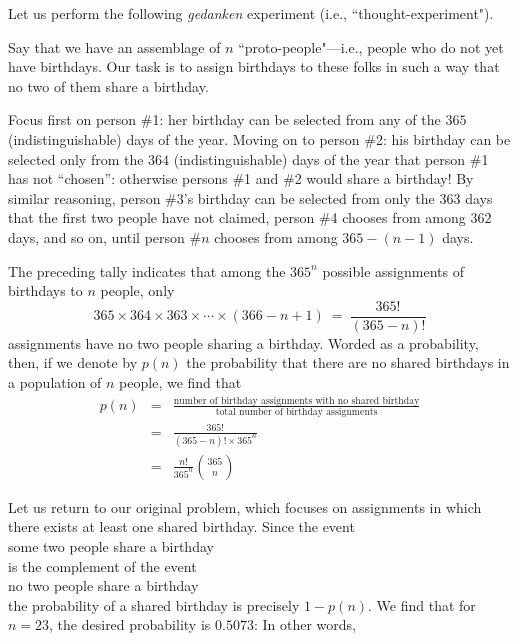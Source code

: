 Let us perform the following {\em gedanken} experiment (i.e., ``thought-experiment").

\smallskip

Say that we have an assemblage of $n$ ``proto-people"---i.e., people who do not yet have  birthdays.
Our task is to assign birthdays to these folks in such a way that no two of them share a birthday.

Focus first on person \#1: her birthday can be selected from any of
the $365$ (indistinguishable) days of the year.  Moving on to person
\#2: his birthday can be selected only from the $364$
(indistinguishable) days of the year that person \#1 has not
``chosen'': otherwise persons \#1 and \#2 would share a birthday!  By
similar reasoning, person \#3's birthday can be selected from only the
$363$ days that the first two people have not claimed, person \#4
chooses from among $362$ days, and so on, until person \#$n$ chooses
from among $365-(n-1)$ days.

The preceding tally indicates that among the $365^n$ possible
assignments of birthdays to $n$ people, only
\[ 365 \times 364 \times 363 \times \cdots \times
(366-n+1) \ = \ \frac{365!}{(365-n)!} 
\]
assignments have no two people sharing a birthday.  Worded as a
probability, then, if we denote by $p(n)$ the probability that there are no shared
birthdays in a population of $n$ people, we find that
\begin{eqnarray*}
p(n) & = &
\frac{\mbox{number of birthday assignments with no shared birthday}}
{\mbox{total number of birthday assignments}} \\
 &  = & \frac{365!}{ (365-n)!  \times 365^n} \\
 & = & \frac{n!}{365^n} {365 \choose n}
\end{eqnarray*}

\medskip

Let us return to our original problem, which focuses on assignments in
which there exists at least one shared birthday.  Since the event \\
\hspace*{.25in}some two people share a birthday \\
is the complement of the event \\
\hspace*{.25in}no two people share a birthday \\
the probability of a shared birthday is precisely $1-p(n)$.  We find
that for $n=23$, the desired probability is $0.5073$:  In other words,

